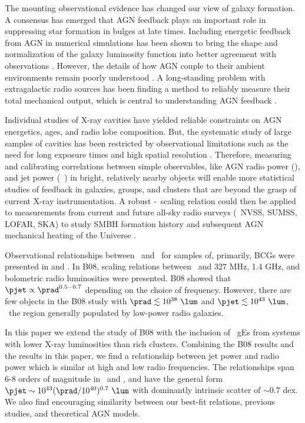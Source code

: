 \documentclass{emulateapj}
\begin{document}
The mounting observational evidence has changed our view of galaxy
formation. A consensus has emerged that AGN feedback plays an
important role in suppressing star formation in bulges at late
times. Including energetic feedback from AGN in numerical simulations
has been shown to bring the shape and normalization of the galaxy
luminosity function into better agreement with observations
\citep{croton06, bower06, saro06, sijacki07}. However, the details of
how AGN couple to their ambient environments remain poorly understood
\citep{2008ASPC..386..343D, 2009arXiv0910.3691M}. A long-standing
problem with extragalactic radio sources has been finding a method to
reliably measure their total mechanical output, which is central to
understanding AGN feedback \citep[\eg][]{1991Natur.349..138R,
  1996AJ....112....9L}.

Individual studies of X-ray cavities have yielded reliable constraints
on AGN energetics, ages, and radio lobe composition. But, the
systematic study of large samples of cavities has been restricted by
observational limitations such as the need for long exposure times and
high spatial resolution \citep{2009arXiv0909.0397B}. Therefore,
measuring and calibrating correlations between simple observables,
like AGN radio power (\prad), and jet power (\eg\ \pjet) in bright,
relatively nearby objects will enable more statistical studies of
feedback in galaxies, groups, and clusters that are beyond the grasp
of current X-ray instrumentation. A robust \pjet-\prad\ scaling
relation could then be applied to measurements from current and future
all-sky radio surveys (\eg\ NVSS, SUMSS, LOFAR, SKA) to study SMBH
formation history and subsequent AGN mechanical heating of the
Universe \citep{croton06, 2006MNRAS.366..397S}.

Observational relationships between \pjet\ and \prad\ for samples of,
primarily, BCGs were presented in \citet[][hereafter B04]{birzan04}
and \citet[][hereafter B08]{birzan08}. In B08, scaling relations
between \pjet\ and 327 MHz, 1.4 GHz, and bolometric radio luminosities
were presented. B08 showed that $\pjet \propto \prad^{0.5-0.7}$
depending on the choice of frequency. However, there are few objects
in the B08 study with $\prad \lesssim 10^{38} ~\lum$ and $\pjet
\lesssim 10^{43} ~\lum$, \ie\ the region generally populated by
low-power radio galaxies.

In this paper we extend the study of B08 with the inclusion of
\samp\ gEs from systems with lower X-ray luminosities than rich
clusters. Combining the B08 results and the results in this paper, we
find a relationship between jet power and radio power which is similar
at high and low radio frequencies. The relationships span 6-8 orders
of magnitude in \pjet\ and \prad, and have the general form $\pjet
\sim 10^{43} (\prad/10^{40})^{0.7} ~\lum$ with dominantly intrinsic
scatter of $\sim 0.7$ dex. We also find encouraging similarity between
our best-fit relations, previous studies, and theoretical AGN models.
\end{document}
